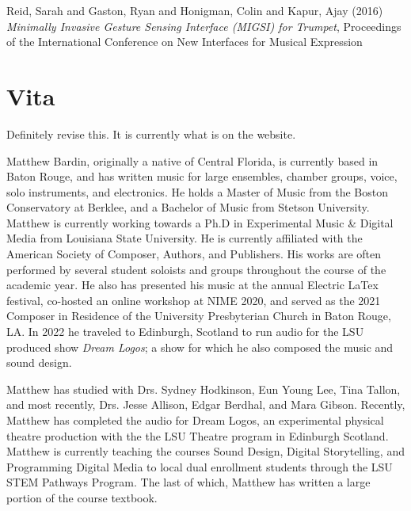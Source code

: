 \backmatter


\begin{thebibliography}{99}


 Reid, Sarah and Gaston, Ryan and Honigman, Colin and Kapur, Ajay (2016) \emph{Minimally Invasive Gesture Sensing Interface (MIGSI) for Trumpet}, Proceedings of the International Conference on New Interfaces for Musical Expression



\end{thebibliography}


\chapter{Vita}

Definitely revise this. It is currently what is on the website.

Matthew Bardin, originally a native of Central Florida, is currently based in Baton Rouge, and has written music for large ensembles, chamber groups, voice, solo instruments, and electronics. He holds a Master of Music from the Boston Conservatory at Berklee, and a  Bachelor of Music from Stetson University. Matthew is currently working towards a Ph.D in Experimental Music \& Digital Media from Louisiana State University. He is currently affiliated with the American Society of Composer, Authors, and Publishers. His works are often performed by several student soloists and groups throughout the course of the academic year. He also has presented his music at the annual Electric LaTex festival, co-hosted an online workshop at NIME 2020, and served as the 2021 Composer in Residence of the University Presbyterian Church in Baton Rouge, LA. In 2022 he traveled to Edinburgh, Scotland to run audio for the LSU produced show \textit{Dream Logos}; a show for which he also composed the music and sound design.

Matthew has studied with Drs. Sydney Hodkinson, Eun Young Lee, Tina Tallon, and most recently, Drs. Jesse Allison, Edgar Berdhal, and Mara Gibson. Recently, Matthew has completed the audio for Dream Logos, an experimental physical theatre production with the the LSU Theatre program in Edinburgh Scotland. Matthew is currently teaching the courses Sound Design, Digital Storytelling, and Programming Digital Media to local dual enrollment students through the LSU STEM Pathways Program. The last of which, Matthew has written a large portion of the course textbook.


